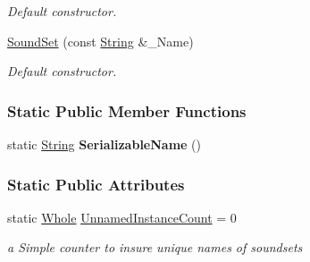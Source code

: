 \begin{DoxyCompactItemize}
\begin{DoxyCompactList}\small\item\em Default constructor. \item\end{DoxyCompactList}\item 
\hypertarget{classphys_1_1SoundSet_a3237068484b781ed267cc41050cd6628}{
\hyperlink{classphys_1_1SoundSet_a3237068484b781ed267cc41050cd6628}{SoundSet} (const \hyperlink{namespacephys_aa03900411993de7fbfec4789bc1d392e}{String} \&\_\-Name)}
\label{classphys_1_1SoundSet_a3237068484b781ed267cc41050cd6628}

\begin{DoxyCompactList}\small\item\em Default constructor. \item\end{DoxyCompactList}\end{DoxyCompactItemize}
\subsubsection*{Static Public Member Functions}
\begin{DoxyCompactItemize}
\item 
\hypertarget{classphys_1_1SoundSet_a7da7fa71b3dd6da20280a879f24cc459}{
static \hyperlink{namespacephys_aa03900411993de7fbfec4789bc1d392e}{String} {\bfseries SerializableName} ()}
\label{classphys_1_1SoundSet_a7da7fa71b3dd6da20280a879f24cc459}

\end{DoxyCompactItemize}
\subsubsection*{Static Public Attributes}
\begin{DoxyCompactItemize}
\item 
\hypertarget{classphys_1_1SoundSet_aaa6e07be3d7ce9b9b8b3dd86e8ca95e9}{
static \hyperlink{namespacephys_a460f6bc24c8dd347b05e0366ae34f34a}{Whole} \hyperlink{classphys_1_1SoundSet_aaa6e07be3d7ce9b9b8b3dd86e8ca95e9}{UnnamedInstanceCount} = 0}
\label{classphys_1_1SoundSet_aaa6e07be3d7ce9b9b8b3dd86e8ca95e9}

\begin{DoxyCompactList}\small\item\em a Simple counter to insure unique names of soundsets \item\end{DoxyCompactList}\end{DoxyCompactItemize}



